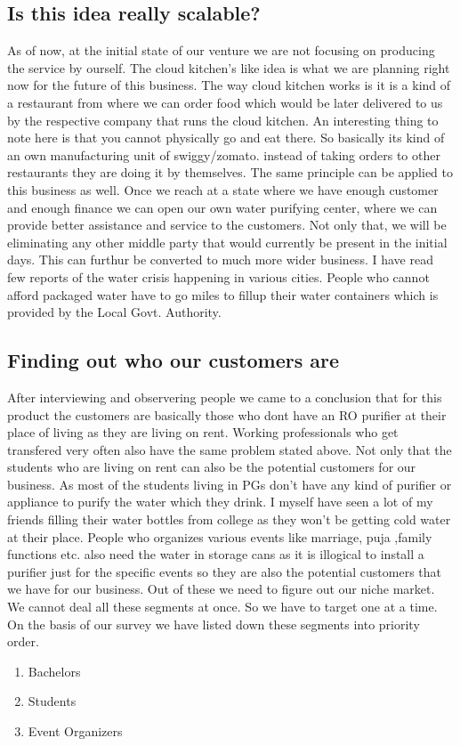 \documentclass[a4paper, 12pt]{article}
\begin{document}
\subsection*{Is this idea really scalable?}
As of now, at the initial state of our venture we are not focusing on producing the service by ourself. The cloud kitchen's like idea is what we are planning right now
for the future of this business. The way cloud kitchen works is it is a kind of a restaurant from where we can order food which would be later delivered to us by the 
respective company that runs the cloud kitchen. An interesting thing to note here is that you cannot physically go and eat there. So basically its kind of an own manufacturing
unit of swiggy/zomato. instead of taking orders to other restaurants they are doing it by themselves. The same principle can be applied to this business as well. Once
we reach at a state where we have enough customer and enough finance we can open our own water purifying center, where we can provide better assistance and service to the
customers. Not only that, we will be eliminating any other middle party that would currently be present in the initial days. This can furthur be converted to much more 
wider business. I have read few reports of the water crisis happening in various cities. People who cannot afford packaged water have to go miles to fillup their water containers
which is provided by the Local Govt. Authority. 

\subsection{Finding out who our customers are}
After interviewing and observering people we came to a conclusion that for this product the customers are basically those
who dont have an RO purifier at their place of living as they are living on rent. Working professionals who get transfered
very often also have the same problem stated above. Not only that the students who are living on rent can also be the 
potential customers for our business. As most of the students living in PGs don't have any kind of purifier or 
appliance to purify the water which they drink. I myself have seen a lot of my friends filling their water bottles from 
college as they won't be getting cold water at their place. People who organizes various events like marriage, puja
,family functions etc. also need the water in storage cans as it is illogical to install a purifier just for the specific events
so they are also the potential customers that we have for our business. Out of these we need to figure out our niche market.
We cannot deal all these segments at once. So we have to target one at a time. On the basis of our survey we have listed down
these segments into priority order.
\begin{enumerate}
    \item Bachelors
    \item Students
    \item Event Organizers
\end{enumerate} 
\end{document}
